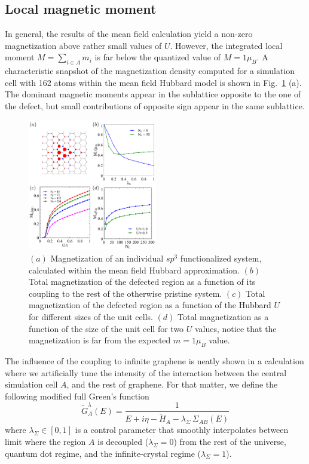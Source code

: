 \documentclass[aps,prb,twocolumn,superscriptaddress]{revtex4-1}
\begin{document}
\subsection{Local magnetic moment}
In general, the results of the mean field calculation yield a non-zero magnetization above rather small values of $U$. However, the integrated local moment $M=\sum_{i\in A} m_i$ is far below the quantized value of $M=1\mu_B$. A characteristic snapshot of the magnetization density computed for a simulation cell with 162 atoms within the mean field Hubbard model is shown in Fig.~\ref{MF} (a). The dominant magnetic moments appear in the sublattice opposite to the one of the defect, but small contributions of opposite sign appear in the same sublattice.
\begin{figure}[t!]
  \centering
    \includegraphics[width=0.5\textwidth]{figMF.pdf}
  \vspace{-15pt}
  \caption{$(a)$ Magnetization of an individual $sp^3$ functionalized system, calculated within the mean field  Hubbard  approximation. $(b)$ Total magnetization of the defected region as a function of its coupling to the rest of the otherwise pristine system. $(c)$ Total magnetization of the defected region as a function of the Hubbard $U$ for different sizes of the unit cells. $(d)$ Total magnetization as a function of the size of the unit cell for two $U$ values, notice that the magnetization is far from the expected $m=1\mu_B$ value.}
  \label{MF}
\end{figure}
The influence of the coupling to infinite graphene is neatly shown in a calculation where we artificially tune the intensity of the interaction between the central simulation cell $A$, and the rest of graphene.
For that matter, we define the following modified full Green's function
\begin{equation}
  \widetilde{G}_{A}^\lambda(E) =
  \frac{1}{E+i\eta-\widetilde{H}_{A}-\lambda_\Sigma\,\Sigma_{AB}(E)}
\end{equation}
where $\lambda_\Sigma\in[0,1]$ is a control parameter that smoothly interpolates
between limit where the region $A$ is decoupled ($\lambda_\Sigma = 0$) from the rest of the universe, quantum dot regime, and the infinite-crystal regime
($\lambda_\Sigma = 1$).
\end{document}
